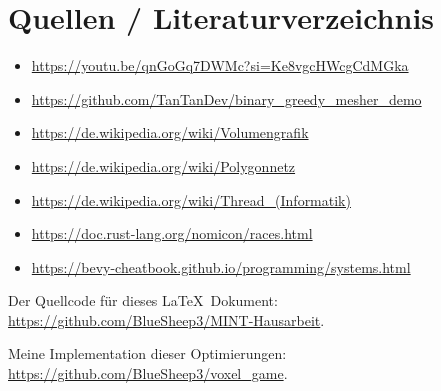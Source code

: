 \section{Quellen / Literaturverzeichnis}

\begin{itemize}
	\item \url{https://youtu.be/qnGoGq7DWMc?si=Ke8vgcHWcgCdMGka}
	\item \url{https://github.com/TanTanDev/binary_greedy_mesher_demo}

	\item \url{https://de.wikipedia.org/wiki/Volumengrafik}
	\item \url{https://de.wikipedia.org/wiki/Polygonnetz}
	\item \url{https://de.wikipedia.org/wiki/Thread_(Informatik)}
	\item \url{https://doc.rust-lang.org/nomicon/races.html}
	\item \url{https://bevy-cheatbook.github.io/programming/systems.html}
\end{itemize}

\setlength{\parindent}{0pt}

Der Quellcode für dieses \LaTeX\ Dokument: \\
\url{https://github.com/BlueSheep3/MINT-Hausarbeit}.

\vspace{0.2cm}

Meine Implementation dieser Optimierungen: \\
\url{https://github.com/BlueSheep3/voxel_game}.
